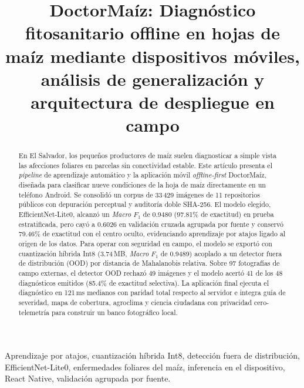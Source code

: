 \documentclass[conference,letterpaper]{IEEEtran}
\newcommand{\Fone}{$F_1$}
\begin{document}
\title{DoctorMaíz: Diagnóstico fitosanitario offline en hojas de maíz mediante dispositivos móviles, análisis de generalización y arquitectura de despliegue en campo}

\author{%
}

\maketitle

\begin{abstract}
En El Salvador, los pequeños productores de maíz suelen diagnosticar a simple vista las afecciones foliares en parcelas sin conectividad estable. Este artículo presenta el \textit{pipeline} de aprendizaje automático y la aplicación móvil \textit{offline-first} DoctorMaíz, diseñada para clasificar nueve condiciones de la hoja de maíz directamente en un teléfono Android. Se consolidó un corpus de 33\,429 imágenes de 11 repositorios públicos con depuración perceptual y auditoría doble SHA-256. El modelo elegido, EfficientNet-Lite0, alcanzó un \textit{Macro} \Fone{} de 0.9480 (97.81\% de exactitud) en prueba estratificada, pero cayó a 0.6026 en validación cruzada agrupada por fuente y conservó 79.46\% de exactitud con el centro oculto, evidenciando aprendizaje por atajos ligado al origen de los datos. Para operar con seguridad en campo, el modelo se exportó con cuantización híbrida Int8 (3.74\,MB, \textit{Macro} \Fone{} de 0.9489) acoplado a un detector fuera de distribución (OOD) por distancia de Mahalanobis relativa. Sobre 97 fotografías de campo externas, el detector OOD rechazó 49 imágenes y el modelo acertó 41 de los 48 diagnósticos emitidos (85.4\% de exactitud selectiva). La aplicación final ejecuta el diagnóstico en 121\,ms medianos con paridad total respecto al servidor e integra guía de severidad, mapa de cobertura, agroclima y ciencia ciudadana con privacidad cero-telemetría para construir un banco fotográfico local.
\end{abstract}

\begin{IEEEkeywords}
Aprendizaje por atajos, cuantización híbrida Int8, detección fuera de distribución, EfficientNet-Lite0, enfermedades foliares del maíz, inferencia en el dispositivo, React Native, validación agrupada por fuente.
\end{IEEEkeywords}
\end{document}
